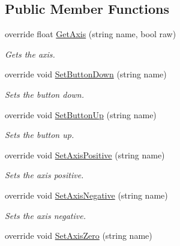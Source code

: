 \subsection*{Public Member Functions}
\begin{DoxyCompactItemize}
\item 
override float \hyperlink{class_lerp2_assets_1_1_cross_platform_input_1_1_platform_specific_1_1_mobile_input_a4bcf5ea3b75e24eba7c21b9a6cae3778}{Get\+Axis} (string name, bool raw)
\begin{DoxyCompactList}\small\item\em Gets the axis. \end{DoxyCompactList}\item 
override void \hyperlink{class_lerp2_assets_1_1_cross_platform_input_1_1_platform_specific_1_1_mobile_input_a1d57171c20c7f519f053bbc87a573f03}{Set\+Button\+Down} (string name)
\begin{DoxyCompactList}\small\item\em Sets the button down. \end{DoxyCompactList}\item 
override void \hyperlink{class_lerp2_assets_1_1_cross_platform_input_1_1_platform_specific_1_1_mobile_input_aadfa727ea04d9c51fb3e443dc7b67466}{Set\+Button\+Up} (string name)
\begin{DoxyCompactList}\small\item\em Sets the button up. \end{DoxyCompactList}\item 
override void \hyperlink{class_lerp2_assets_1_1_cross_platform_input_1_1_platform_specific_1_1_mobile_input_a3ad0a492b131832757f0877e3a599a4d}{Set\+Axis\+Positive} (string name)
\begin{DoxyCompactList}\small\item\em Sets the axis positive. \end{DoxyCompactList}\item 
override void \hyperlink{class_lerp2_assets_1_1_cross_platform_input_1_1_platform_specific_1_1_mobile_input_a97c5a5b9836a920ab604f6b9d9cad41f}{Set\+Axis\+Negative} (string name)
\begin{DoxyCompactList}\small\item\em Sets the axis negative. \end{DoxyCompactList}\item 
override void \hyperlink{class_lerp2_assets_1_1_cross_platform_input_1_1_platform_specific_1_1_mobile_input_ab1caba02983a59d7c031f435a53bb7f9}{Set\+Axis\+Zero} (string name)

\end{DoxyCompactItemize}
